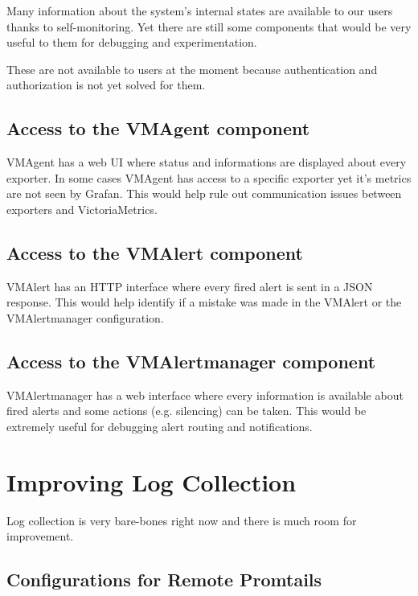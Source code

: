 Many information about the system's internal states are available to our users
thanks to self-monitoring. Yet there are still some components that would be
very useful to them for debugging and experimentation.

These are not available to users at the moment because authentication and
authorization is not yet solved for them.

\subsection{Access to the VMAgent component}

VMAgent has a web UI where status and informations are displayed about every
exporter. In some cases VMAgent has access to a specific exporter yet it's
metrics are not seen by Grafan. This would help rule out communication issues
between exporters and VictoriaMetrics.

\subsection{Access to the VMAlert component}

VMAlert has an HTTP interface where every fired alert is sent in a JSON
response. This would help identify if a mistake was made in the VMAlert or the
VMAlertmanager configuration.

\subsection{Access to the VMAlertmanager component}

VMAlertmanager has a web interface where every information is available about
fired alerts and some actions (e.g. silencing) can be taken. This would be
extremely useful for debugging alert routing and notifications.

\section{Improving Log Collection}

Log collection is very bare-bones right now and there is much room for
improvement.

\subsection{Configurations for Remote Promtails}

